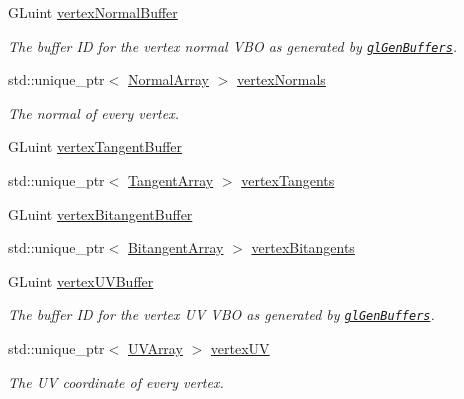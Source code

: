 \begin{DoxyCompactItemize}
G\+Luint \hyperlink{class_rendering_object_a91649e3a653f2266cd00c718f10849f9}{vertex\+Normal\+Buffer}
\begin{DoxyCompactList}\small\item\em The buffer ID for the vertex normal V\+BO as generated by \href{https://www.opengl.org/sdk/docs/man/html/glGenBuffers.xhtml}{\tt gl\+Gen\+Buffers}. \end{DoxyCompactList}\item 
std\+::unique\+\_\+ptr$<$ \hyperlink{class_rendering_object_a327c4d892de8d6138fb59afa6d078257}{Normal\+Array} $>$ \hyperlink{class_rendering_object_ac28d301f97d29ab603f65f8e823063b4}{vertex\+Normals}
\begin{DoxyCompactList}\small\item\em The normal of every vertex. \end{DoxyCompactList}\item 
G\+Luint \hyperlink{class_rendering_object_a0eac563be6e35a3cc4409d43a2abaa04}{vertex\+Tangent\+Buffer}
\item 
std\+::unique\+\_\+ptr$<$ \hyperlink{class_rendering_object_a45b53e911c2f0131aa10e89869d38944}{Tangent\+Array} $>$ \hyperlink{class_rendering_object_a7bca44786929dd3aca3d6ca1acc7597f}{vertex\+Tangents}
\item 
G\+Luint \hyperlink{class_rendering_object_a0c2f16211e989dd4d9d2ebbf7c027fb6}{vertex\+Bitangent\+Buffer}
\item 
std\+::unique\+\_\+ptr$<$ \hyperlink{class_rendering_object_a6c6bf305a5f0f9ce1006f374c753c856}{Bitangent\+Array} $>$ \hyperlink{class_rendering_object_a3d0ab70c5a87e4cd7fff87f3ee927678}{vertex\+Bitangents}
\item 
G\+Luint \hyperlink{class_rendering_object_ad583c70014e3f6ab0c9b62ea3c96ad25}{vertex\+U\+V\+Buffer}
\begin{DoxyCompactList}\small\item\em The buffer ID for the vertex UV V\+BO as generated by \href{https://www.opengl.org/sdk/docs/man/html/glGenBuffers.xhtml}{\tt gl\+Gen\+Buffers}. \end{DoxyCompactList}\item 
std\+::unique\+\_\+ptr$<$ \hyperlink{class_rendering_object_a504ecd45ebe36dfa5b78c46d64d9904a}{U\+V\+Array} $>$ \hyperlink{class_rendering_object_afc405316bddec4ba1d5c228ecc0d9061}{vertex\+UV}
\begin{DoxyCompactList}\small\item\em The UV coordinate of every vertex. \end{DoxyCompactList}\item 

\end{DoxyCompactItemize}
